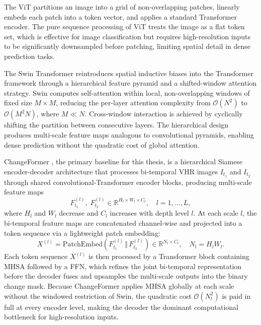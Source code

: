 The \ac{ViT} \cite{Dosovitskiy2021ViT} partitions an image into a grid of non-overlapping patches, linearly embeds each patch into a token vector, and applies a standard Transformer encoder. The pure sequence processing of \ac{ViT} treats the image as a flat token set, which is effective for image classification but requires high-resolution inputs to be significantly downsampled before patching, limiting spatial detail in dense prediction tasks.

The Swin Transformer \cite{Liu2021Swin} reintroduces spatial inductive biases into the Transformer framework through a hierarchical feature pyramid and a shifted-window attention strategy. Swin computes self-attention within local, non-overlapping windows of fixed size $M \times M$, reducing the per-layer attention complexity from $\mathcal{O}(N^2)$ to $\mathcal{O}(M^2 N)$, where $M \ll N$. Cross-window interaction is achieved by cyclically shifting the partition between consecutive layers. The hierarchical design produces multi-scale feature maps analogous to convolutional pyramids, enabling dense prediction without the quadratic cost of global attention.

ChangeFormer \cite{Bandara2022ChangeFormer}, the primary baseline for this thesis, is a hierarchical Siamese encoder-decoder architecture that processes bi-temporal \ac{VHR} images $I_{t_1}$ and $I_{t_2}$ through shared convolutional-Transformer encoder blocks, producing multi-scale feature maps
\begin{equation}
F_{t_1}^{(l)},\; F_{t_2}^{(l)} \in \mathbb{R}^{H_l \times W_l \times C_l},
\quad l = 1, \ldots, L,
\label{eq:multiscale_features}
\end{equation}
where $H_l$ and $W_l$ decrease and $C_l$ increases with depth level $l$. At each scale $l$, the bi-temporal feature maps are concatenated channel-wise and projected into a token sequence via a lightweight patch embedding:
\begin{equation}
X^{(l)} = \mathrm{PatchEmbed}\!\left(F_{t_1}^{(l)} \,\Vert\, F_{t_2}^{(l)}\right)
    \in \mathbb{R}^{N_l \times C_l},
\quad N_l = H_l W_l.
\label{eq:patchembedding}
\end{equation}
Each token sequence $X^{(l)}$ is then processed by a Transformer block containing \ac{MHSA} followed by a \ac{FFN}, which refines the joint bi-temporal representation before the decoder fuses and upsamples the multi-scale outputs into the binary change mask. Because ChangeFormer applies \ac{MHSA} globally at each scale without the windowed restriction of Swin, the quadratic cost $\mathcal{O}(N_l^2)$ is paid in full at every encoder level, making the decoder the dominant computational bottleneck for high-resolution inputs.


